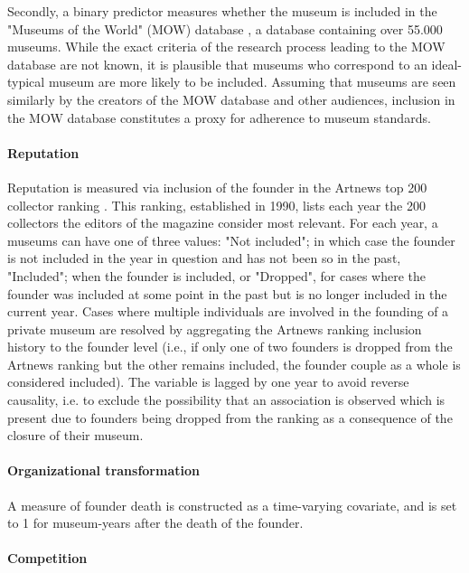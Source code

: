 \documentclass[12pt]{article}
\begin{document}
Secondly, a binary predictor measures whether the museum is included in the "Museums of the World" (MOW) database \parencite{deGruyter_2021_MOW}, a database containing over 55.000 museums.
While the exact criteria of the research process leading to the MOW database are not known, it is plausible that museums who correspond to an ideal-typical museum are more likely to be included.
Assuming that museums are seen similarly by the creators of the MOW database and other audiences, inclusion in the MOW database constitutes a proxy for adherence to museum standards. 


\paragraph*{Reputation}


Reputation is measured via inclusion of the founder in the Artnews top 200 collector ranking \parencite{Artnews_ranking}.
This ranking, established in 1990, lists each year the 200 collectors the editors of the magazine consider most relevant.
For each year, a museums can have one of three values: "Not included"; in which case the founder is not included in the year in question and has not been so in the past, "Included"; when the founder is included, or "Dropped", for cases where the founder was included at some point in the past but is no longer included in the current year.
Cases where multiple individuals are involved in the founding of a private museum are resolved by aggregating the Artnews ranking inclusion history to the founder level (i.e., if only one of two founders is dropped from the Artnews ranking but the other remains included, the founder couple as a whole is considered included).
The variable is lagged by one year to avoid reverse causality, i.e. to exclude the possibility that an association is observed which is present due to founders being dropped from the ranking as a consequence of the closure of their museum.


\paragraph*{Organizational transformation}

A measure of founder death is constructed as a time-varying covariate, and is set to 1 for museum-years after the death of the founder. 

\paragraph*{Competition}
\end{document}

